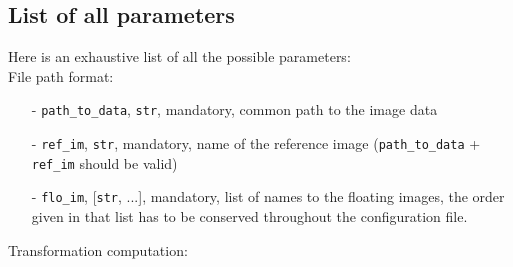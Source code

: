 \documentclass[10pt,a4paper]{book}
\begin{document}
\subsection{List of all parameters}
Here is an exhaustive list of all the possible parameters:\\
File path format:
\begin{enumerate}
\item[-] \texttt{path\_to\_data}, \texttt{str}, mandatory, common path to the image data
\item[-] \texttt{ref\_im}, \texttt{str}, mandatory, name of the reference image (\texttt{path\_to\_data} + \texttt{ref\_im} should be valid)
\item[-] \texttt{flo\_im}, [\texttt{str}, ...], mandatory, list of names to the floating images, the order given in that list has to be conserved throughout the configuration file.
\end{enumerate}
Transformation computation:
\end{document}
